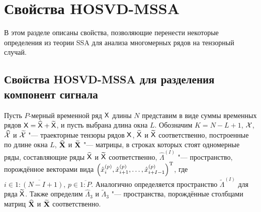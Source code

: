 \documentclass[specialist,
  substylefile=spbu.rtx,
subf,href,colorlinks=true, 12pt]{disser}
\theoremstyle{plain}
\theoremstyle{definition}
\theoremstyle{remark}
\begin{document}
\section{Свойства HOSVD-MSSA}\label{sec:hosvd-mssa-properties}
В этом разделе описаны свойства, позволяющие перенести некоторые определения из теории SSA для анализа многомерных
рядов на тензорный случай.


\subsection{Свойства HOSVD-MSSA для разделения компонент сигнала}\label{subsec:hosvd-mssa-sep-properties}
Пусть $P$-мерный временной ряд $\mathsf{X}$ длины $N$ представим в виде суммы временных рядов $\mathsf{X}=\widehat{\mathsf{X}} +
\widetilde{\mathsf{X}}$, и пусть выбрана длина окна $L$.
Обозначим $K = N - L + 1$, $\mathcal{X}$, $\widehat{\mathcal{X}}$ и $\widetilde{\mathcal{X}}$ "--- траекторные тензоры рядов $\mathsf{X}$,
$\widehat{\mathsf{X}}$ и $\widetilde{\mathsf{X}}$ соответственно, построенные по длине окна $L$,
$\widehat{\mathbf{X}}$ и $\widetilde{\mathbf{X}}$ "--- матрицы, в строках которых стоят одномерные ряды,
составляющие ряды $\widehat{\mathsf{X}}$ и $\widetilde{\mathsf{X}}$ соответственно,
$\widehat{\Lambda}^{(I)}$ "--- пространство, порождённое векторами вида
$\left(\hat{x}_i^{(p)}, \hat{x}_{i + 1}^{(p)}, \ldots, \hat{x}_{i+I-1}^{(p)}\right)^{\mathrm{T}}$, где
$i \in \overline{1:(N-I+1)},\, p \in \overline{1:P}$.
Аналогично определяется пространство $\widetilde{\Lambda}^{(I)}$ для ряда $\widetilde{\mathsf{X}}$.
Также определим $\widehat{\Lambda}_3$ и $\widetilde{\Lambda}_3$ "--- пространства, порождённые столбцами
матриц $\widehat{\mathbf{X}}$ и $\widetilde{\mathbf{X}}$ соответственно.
\end{document}
